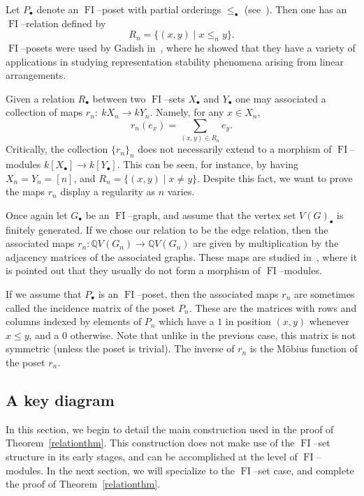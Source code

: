 \documentclass[ALCO,ThmDefs,Unicode,epreuves]{cedram}
\DeclareMathOperator{\FI}{FI}
\newcommand{\Q}{\mathbb{Q}}
\newcommand{\dt}{\bullet}
\begin{document}
\begin{example}
Let $P_\dt$ denote an $\FI$--poset with partial orderings $\leq_\dt$ (see~\cite{G}). Then one has an $\FI$--relation defined by
\[
R_n = \{(x,y) \mid x \leq_n y\}.
\]
$\FI$--posets were used by Gadish in~\cite{G}, where he showed that they have a variety of applications in studying representation stability phenomena arising from linear arrangements.
\end{example}

Given a relation $R_\dt$ between two $\FI$--sets $X_\dt$ and $Y_\dt$ one may associated a collection of maps $r_n: \ kX_n \rightarrow kY_n$. Namely, for any $x \in X_n$,
\[
r_n(e_x) = \sum_{(x,y) \in R_n} e_y.
\]
Critically, the collection $\{r_n\}_n$ does not necessarily extend to a morphism of $\FI$--modules $k[X_\dt] \rightarrow k[Y_\dt]$. This can be seen, for instance, by having $X_n = Y_n = [n]$, and $R_n = \{(x,y) \mid x \neq y\}$. Despite this fact, we want to prove the maps $r_n$ display a regularity as $n$ varies.

\begin{example}
Once again let $G_\dt$ be an $\FI$--graph, and assume that the vertex set $V(G)_\dt$ is finitely generated. If we chose our relation to be the edge relation, then the associated maps $r_n: \Q V(G_n) \rightarrow \Q V(G_n)$ are given by multiplication by the adjacency matrices of the associated graphs. These maps are studied in~\cite{RW}, where it is pointed out that they usually do not form a morphism of $\FI$--modules.
\end{example}

\begin{example}
If we assume that $P_\dt$ is an $\FI$--poset, then the associated maps $r_n$ are sometimes called the incidence matrix of the poset $P_n$. These are the matrices with rows and columns indexed by elements of $P_n$ which have a $1$ in position $(x,y)$ whenever $x \leq y$, and a $0$ otherwise. Note that unlike in the previous case, this matrix is not symmetric (unless the poset is trivial). The inverse of $r_n$ is the M{\"o}bius function of the poset $r_n$.
\end{example}

\subsection{A key diagram}\label{keydiagram}

In this section, we begin to detail the main construction used in the proof of Theorem~\ref{relationthm}. This construction does not make use of the $\FI$--set structure in its early stages, and can be accomplished at the level of $\FI$--modules. In the next section, we will specialize to the $\FI$--set case, and complete the proof of Theorem~\ref{relationthm}.
\end{document}
